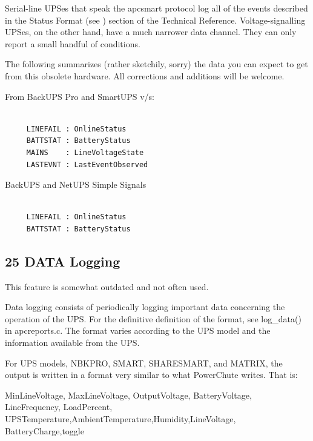 Serial-line UPSes that speak the apcsmart protocol log all of the events
described in the Status Format (see 
) section of
the Technical Reference.  Voltage-signalling UPSes, on the other hand, have a
much narrower data channel.  They can only report a small handful of
conditions.  

The following summarizes (rather sketchily, sorry) the data you can expect to
get from this obsolete hardware.  All corrections and additions will be
welcome.  

From BackUPS Pro and SmartUPS v/s: 

\footnotesize
\begin{verbatim}
     
     LINEFAIL : OnlineStatus
     BATTSTAT : BatteryStatus
     MAINS    : LineVoltageState
     LASTEVNT : LastEventObserved
\end{verbatim}
\normalsize

BackUPS and NetUPS Simple Signals 

\footnotesize
\begin{verbatim}
     
     LINEFAIL : OnlineStatus
     BATTSTAT : BatteryStatus
\end{verbatim}
\normalsize

\label{DATA-Logging}

\subsection*{25 DATA Logging}

\label{index-Logging_002c-DATA-233}
\label{index-DATA-Logging-234}
This feature is somewhat outdated and not often used.  

Data logging consists of periodically logging important data concerning the
operation of the UPS. For the definitive definition of the format, see
log\_data() in apcreports.c. The format varies according to the UPS model and
the information available from the UPS.  

For UPS models, NBKPRO, SMART, SHARESMART, and MATRIX, the output is written
in a format very similar to what PowerChute writes. That is:  

MinLineVoltage, MaxLineVoltage, OutputVoltage, BatteryVoltage, LineFrequency,
LoadPercent, UPSTemperature,AmbientTemperature,Humidity,LineVoltage,
BatteryCharge,toggle  

